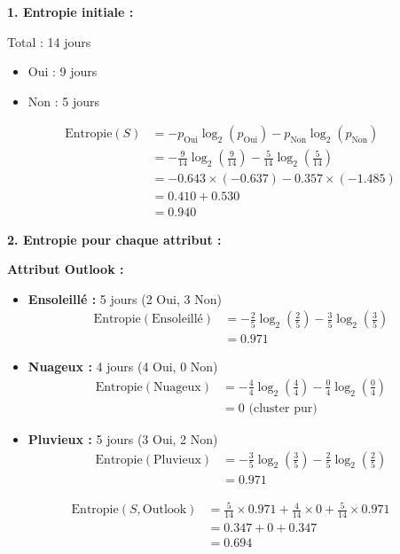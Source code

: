 \documentclass[11pt,a4paper]{article}
\begin{document}
\begin{solutionbox}
\textbf{1. Entropie initiale :}

Total : 14 jours
\begin{itemize}
    \item Oui : 9 jours
    \item Non : 5 jours
\end{itemize}

\begin{align*}
\text{Entropie}(S) &= -p_{\text{Oui}} \log_2(p_{\text{Oui}}) - p_{\text{Non}} \log_2(p_{\text{Non}}) \\
            &= -\frac{9}{14} \log_2\left(\frac{9}{14}\right) - \frac{5}{14} \log_2\left(\frac{5}{14}\right) \\
            &= -0.643 \times (-0.637) - 0.357 \times (-1.485) \\
            &= 0.410 + 0.530 \\
            &= 0.940
\end{align*}

\textbf{2. Entropie pour chaque attribut :}

\textbf{Attribut Outlook :}
\begin{itemize}
    \item \textbf{Ensoleillé :} 5 jours (2 Oui, 3 Non)
    \begin{align*}
    \text{Entropie}(\text{Ensoleillé}) &= -\frac{2}{5}\log_2\left(\frac{2}{5}\right) - \frac{3}{5}\log_2\left(\frac{3}{5}\right) \\
                         &= 0.971
    \end{align*}
    \item \textbf{Nuageux :} 4 jours (4 Oui, 0 Non)
    \begin{align*}
    \text{Entropie}(\text{Nuageux}) &= -\frac{4}{4}\log_2\left(\frac{4}{4}\right) - \frac{0}{4}\log_2\left(\frac{0}{4}\right) \\
                      &= 0 \text{ (cluster pur)}
    \end{align*}
    \item \textbf{Pluvieux :} 5 jours (3 Oui, 2 Non)
    \begin{align*}
    \text{Entropie}(\text{Pluvieux}) &= -\frac{3}{5}\log_2\left(\frac{3}{5}\right) - \frac{2}{5}\log_2\left(\frac{2}{5}\right) \\
                       &= 0.971
    \end{align*}
\end{itemize}

\begin{align*}
\text{Entropie}(S, \text{Outlook}) &= \frac{5}{14} \times 0.971 + \frac{4}{14} \times 0 + \frac{5}{14} \times 0.971 \\
                      &= 0.347 + 0 + 0.347 \\
                      &= 0.694
\end{align*}


\end{solutionbox}
\end{document}
